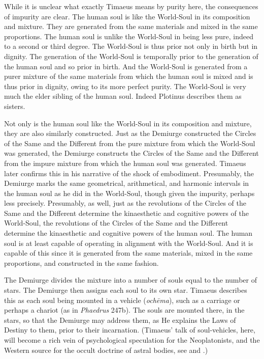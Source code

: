While it is unclear what exactly Timaeus means by purity here, the consequences of impurity are clear. The human soul is like the World-Soul in its composition and mixture. They are generated from the same materials and mixed in the same proportions. The human soul is unlike the World-Soul in being less pure, indeed to a second or third degree. The World-Soul is thus prior not only in birth but in dignity. The generation of the World-Soul is temporally prior to the generation of the human soul and so prior in birth. And the World-Soul is generated from a purer mixture of the same materials from which the human soul is mixed and is thus prior in dignity, owing to its more perfect purity. The World-Soul is very much the elder sibling of the human soul. Indeed Plotinus describes them as sisters.

Not only is the human soul like the World-Soul in its composition and mixture, they are also similarly constructed. Just as the Demiurge constructed the Circles of the Same and the Different from the pure mixture from which the World-Soul was generated, the Demiurge constructs the Circles of the Same and the Different from the impure mixture from which the human soul was generated. Timaeus later confirms this in his narrative of the shock of embodiment. Presumably, the Demiurge marks the same geometrical, arithmetical, and harmonic intervals in the human soul as he did in the World-Soul, though given the impurity, perhaps less precisely. Presumably, as well, just as the revolutions of the Circles of the Same and the Different determine the kinaesthetic and cognitive powers of the World-Soul, the revolutions of the Circles of the Same and the Different determine the kinaesthetic and cognitive powers of the human soul. The human soul is at least capable of operating in alignment with the World-Soul. And it is capable of this since it is generated from the same materials, mixed in the same proportions, and constructed in the same fashion.

The Demiurge divides the mixture into a number of souls equal to the number of stars. The Demiurge then assigns each soul to its own star. Timaeus describes this as each soul being mounted in a vehicle (\emph{ochēma}), such as a carriage or perhaps a chariot (as in \emph{Phaedrus} 247b). The souls are mounted there, in the stars, so that the Demiurge may address them, as He explains the Laws of Destiny to them, prior to their incarnation. (Timaeus' talk of soul-vehicles, here, will become a rich vein of psychological speculation for the Neoplatonists, and the Western source for the occult doctrine of astral bodies, see \citealt[appendix 2]{Dodds:1963ul} and \citealt{Finamore:1985aa}.)

